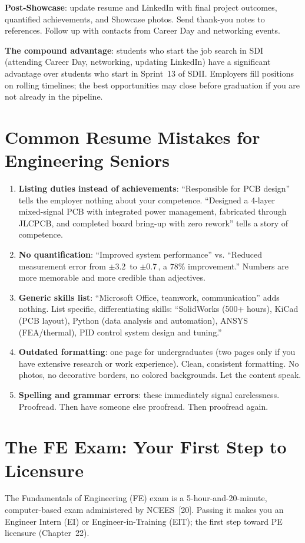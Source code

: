 \textbf{Post-Showcase}: update resume and LinkedIn with final project outcomes, quantified achievements, and Showcase photos. Send thank-you notes to references. Follow up with contacts from Career Day and networking events.

\textbf{The compound advantage}: students who start the job search in SDI (attending Career Day, networking, updating LinkedIn) have a significant advantage over students who start in Sprint~13 of SDII. Employers fill positions on rolling timelines; the best opportunities may close before graduation if you are not already in the pipeline.

\section{Common Resume Mistakes for Engineering Seniors}
\begin{enumerate}[nosep,leftmargin=1.5em]
\item \textbf{Listing duties instead of achievements}: ``Responsible for PCB design'' tells the employer nothing about your competence. ``Designed a 4-layer mixed-signal PCB with integrated power management, fabricated through JLCPCB, and completed board bring-up with zero rework'' tells a story of competence.
\item \textbf{No quantification}: ``Improved system performance'' vs. ``Reduced measurement error from $\pm$3.2\,\degC{} to $\pm$0.7\,\degC{}, a 78\% improvement.'' Numbers are more memorable and more credible than adjectives.
\item \textbf{Generic skills list}: ``Microsoft Office, teamwork, communication'' adds nothing. List specific, differentiating skills: ``SolidWorks (500+ hours), KiCad (PCB layout), Python (data analysis and automation), ANSYS (FEA/thermal), PID control system design and tuning.''
\item \textbf{Outdated formatting}: one page for undergraduates (two pages only if you have extensive research or work experience). Clean, consistent formatting. No photos, no decorative borders, no colored backgrounds. Let the content speak.
\item \textbf{Spelling and grammar errors}: these immediately signal carelessness. Proofread. Then have someone else proofread. Then proofread again.
\end{enumerate}



\section{The FE Exam: Your First Step to Licensure}
The Fundamentals of Engineering (FE) exam is a 5-hour-and-20-minute, computer-based exam administered by NCEES~[20]. Passing it makes you an Engineer Intern (EI) or Engineer-in-Training (EIT); the first step toward PE licensure (Chapter~22).

